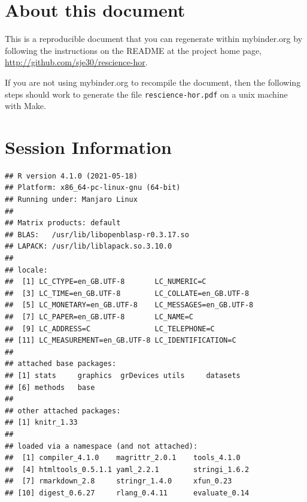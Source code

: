 \hypertarget{about-this-document}{%
\section{About this document}\label{about-this-document}}

This is a reproducible document that you can regenerate within
mybinder.org by following the instructions on the README at the project
home page, \url{http://github.com/sje30/rescience-hor}.

If you are not using mybinder.org to recompile the document, then the
following steps should work to generate the file
\texttt{rescience-hor.pdf} on a unix machine with Make.

\begin{Shaded}
\begin{Highlighting}[]
\NormalTok{(}\NormalTok{)}
\NormalTok{(}\NormalTok{)}
\end{Highlighting}
\end{Shaded}

\clearpage

\hypertarget{session-information}{%
\section{Session Information}\label{session-information}}

\begin{Shaded}
\begin{Highlighting}[]
\NormalTok{()}
\end{Highlighting}
\end{Shaded}

\begin{verbatim}
## R version 4.1.0 (2021-05-18)
## Platform: x86_64-pc-linux-gnu (64-bit)
## Running under: Manjaro Linux
## 
## Matrix products: default
## BLAS:   /usr/lib/libopenblasp-r0.3.17.so
## LAPACK: /usr/lib/liblapack.so.3.10.0
## 
## locale:
##  [1] LC_CTYPE=en_GB.UTF-8       LC_NUMERIC=C              
##  [3] LC_TIME=en_GB.UTF-8        LC_COLLATE=en_GB.UTF-8    
##  [5] LC_MONETARY=en_GB.UTF-8    LC_MESSAGES=en_GB.UTF-8   
##  [7] LC_PAPER=en_GB.UTF-8       LC_NAME=C                 
##  [9] LC_ADDRESS=C               LC_TELEPHONE=C            
## [11] LC_MEASUREMENT=en_GB.UTF-8 LC_IDENTIFICATION=C       
## 
## attached base packages:
## [1] stats     graphics  grDevices utils     datasets 
## [6] methods   base     
## 
## other attached packages:
## [1] knitr_1.33
## 
## loaded via a namespace (and not attached):
##  [1] compiler_4.1.0    magrittr_2.0.1    tools_4.1.0      
##  [4] htmltools_0.5.1.1 yaml_2.2.1        stringi_1.6.2    
##  [7] rmarkdown_2.8     stringr_1.4.0     xfun_0.23        
## [10] digest_0.6.27     rlang_0.4.11      evaluate_0.14
\end{verbatim}

